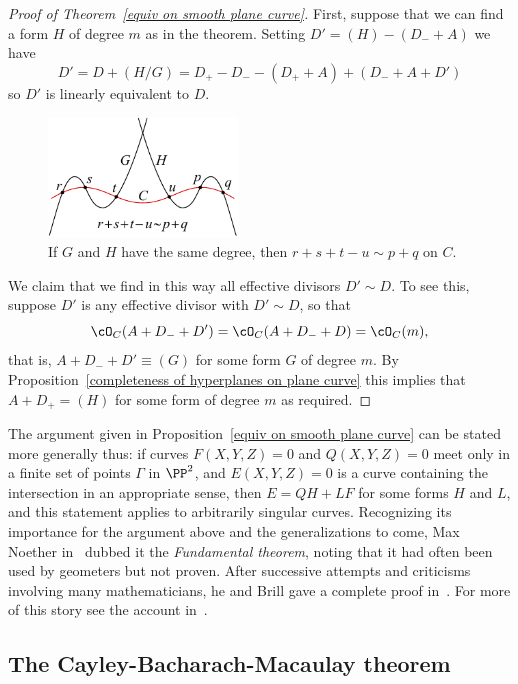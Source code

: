 \begin{proof}[Proof of Theorem~\ref{equiv on smooth plane curve}]
First, suppose that we can find a form $H$ of degree $m$ as in the theorem.
Setting $D' = (H) -(D_{-}+A)$ we have
$$
D' = D + (H/G) = D_{+}- D_{-} - (D_{+}+A)+(D_{-}+A+D')
$$
so $D'$ is linearly equivalent to $D$. 

\begin{figure}
\centerline {\includegraphics[height=1.25in]{"main/Fig14-1"}}
\caption{If $G$ and $H$ have the same degree, then $r+s+t-u\sim p+q$ on $C$.}
\label{Fig14.3}
\end{figure}

We claim that we find in this way all effective divisors $D' \sim D$. 
To see this, suppose $D'$ is any effective divisor with $D' \sim D$, so that
$$
\cO_C(A+D_{-}+D') = \cO_C(A+D_{-}+D)  = \cO_C(m),
$$
that is, $A+D_{-}+D' \equiv (G)$ for some form $G$ of degree $m$. By Proposition~\ref{completeness of hyperplanes on plane curve}
this implies that $A+D_{+} = (H)$ for some form of degree $m$ as required.
\end{proof}


The argument given in Proposition~\ref{equiv on smooth plane curve} can be stated more generally thus:  if curves $F(X,Y,Z)=0$ and $Q(X,Y,Z)=0$ 
meet only in a finite set of points $\Gamma$ in $\PP^{2}$, and $E(X,Y,Z) = 0$ is a curve containing the intersection in an appropriate sense,
then $E = QH +LF$ for some forms $H$ and $L$, and this statement applies to arbitrarily singular curves. Recognizing its importance for the argument above and the generalizations to come, Max Noether in~\cite{Noether1873} dubbed it the \emph{Fundamental theorem}, 
noting that it had often been used by geometers but not proven. After successive attempts and 
criticisms involving many mathematicians, he and Brill gave a complete proof in~\cite{Brill-Noether}. For more of this story see the account in~\cite{eisenbud-gray}.

\subsection{The Cayley-Bacharach-Macaulay theorem}\label{CB section}

